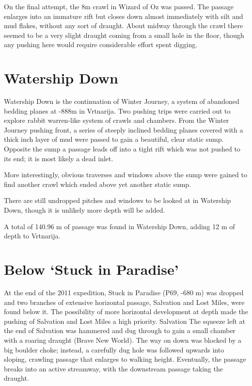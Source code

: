 On the final attempt, the 8m crawl in Wizard of Oz was passed. The
passage enlarges into an immature rift but closes down almost
immediately with silt and mud flakes, without any sort of draught. About
midway through the crawl there seemed to be a very slight draught coming
from a small hole in the floor, though any pushing here would require
considerable effort spent digging.

\hypertarget{watership-down}{%
\section{Watership Down}\label{watership-down}}

Watership Down is the continuation of Winter Journey, a system of
abandoned bedding planes at -888m in Vrtnarija. Two pushing trips were
carried out to explore rabbit warren-like system of crawls and chambers.
From the Winter Journey pushing front, a series of steeply inclined
bedding planes covered with a thick inch layer of mud were passed to
gain a beautiful, clear static sump. Opposite the sump a passage leads
off into a tight rift which was not pushed to its end; it is most likely
a dead inlet.

More interestingly, obvious traverses and windows above the sump were
gained to find another crawl which ended above yet another static sump.

There are still undropped pitches and windows to be looked at in
Watership Down, though it is unlikely more depth will be added.

A total of 140.96 m of passage was found in Watership Down, adding 12 m
of depth to Vrtnarija.

\hypertarget{below-stuck-in-paradise}{%
\section{Below `Stuck in Paradise'}\label{below-stuck-in-paradise}}

At the end of the 2011 expedition, Stuck in Paradise (P69, -680 m) was
dropped and two branches of extensive horizontal passage, Salvation and
Lost Miles, were found below it. The possibility of more horizontal
development at depth made the pushing of Salvation and Lost Miles a high
priority. Salvation The squeeze left at the end of Salvation was
hammered and dug through to gain a small chamber with a roaring draught
(Brave New World). The way on down was blocked by a big boulder choke;
instead, a carefully dug hole was followed upwards into sloping,
crawling passage that enlarges to walking height. Eventually, the
passage breaks into an active streamway, with the downstream passage
taking the draught.

